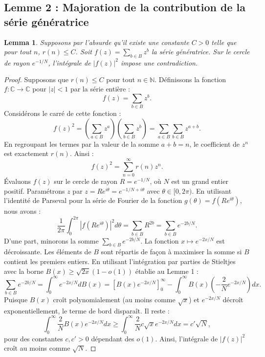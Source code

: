 \documentclass[11pt,a4paper]{article}
\newtheorem{lemma}[theorem]{Lemma}
\begin{document}
\subsection{Lemme 2 : Majoration de la contribution de la s\'erie g\'en\'eratrice}
\begin{lemma}
Supposons par l'absurde qu'il existe une constante $C > 0$ telle que pour tout $n$, $r(n) \le C$. Soit $f(z) = \sum_{b \in B} z^b$ la s\'erie g\'en\'eratrice. Sur le cercle de rayon $e^{-1/N}$, l'int\'egrale de $|f(z)|^2$ impose une contradiction.
\end{lemma}
\begin{proof}
Supposons que $r(n) \le C$ pour tout $n \in \mathbb{N}$.
D\'efinissons la fonction $f : \mathbb{C} \to \mathbb{C}$ pour $|z| < 1$ par la s\'erie enti\`ere :
\begin{equation}
f(z) = \sum_{b \in B} z^b.
\end{equation}
Consid\'erons le carr\'e de cette fonction :
\begin{equation}
f(z)^2 = \left(\sum_{a \in B} z^a\right) \left(\sum_{b \in B} z^b\right) = \sum_{a \in B} \sum_{b \in B} z^{a+b}.
\end{equation}
En regroupant les termes par la valeur de la somme $a + b = n$, le coefficient de $z^n$ est exactement $r(n)$. Ainsi :
\begin{equation}
f(z)^2 = \sum_{n=0}^\infty r(n) z^n.
\end{equation}
\'Evaluons $f(z)$ sur le cercle de rayon $R = e^{-1/N}$, o\`u $N$ est un grand entier positif. Param\'etrons $z$ par $z = R e^{i\theta} = e^{-1/N + i\theta}$ avec $\theta \in [0, 2\pi)$.
En utilisant l'identit\'e de Parseval pour la s\'erie de Fourier de la fonction $g(\theta) = f(R e^{i\theta})$, nous avons :
\begin{equation}
\frac{1}{2\pi} \int_{0}^{2\pi} |f(R e^{i\theta})|^2 d\theta = \sum_{b \in B} R^{2b} = \sum_{b \in B} e^{-2b/N}.
\end{equation}
D'une part, minorons la somme $\sum_{b \in B} e^{-2b/N}$. La fonction $x \mapsto e^{-2x/N}$ est d\'ecroissante.
Les \'el\'ements de $B$ sont r\'epartis de fa\c{c}on \`a maximiser la somme si $B$ contient les premiers entiers.
En utilisant l'int\'egration par parties de Stieltjes avec la borne $B(x) \ge \sqrt{2x}(1 - o(1))$ \'etablie au Lemme 1 :
\begin{equation}
\sum_{b \in B} e^{-2b/N} = \int_{0}^\infty e^{-2x/N} dB(x) = \left[ B(x) e^{-2x/N} \right]_0^\infty - \int_{0}^\infty B(x) \left(-\frac{2}{N} e^{-2x/N}\right) dx.
\end{equation}
Puisque $B(x)$ cro\^it polynomialement (au moins comme $\sqrt{x}$) et $e^{-2x/N}$ d\'ecro\^it exponentiellement, le terme de bord dispara\^it. Il reste :
\begin{equation}
\int_{0}^\infty \frac{2}{N} B(x) e^{-2x/N} dx \ge \int_{0}^\infty \frac{2}{N} c \sqrt{x} e^{-2x/N} dx = c' \sqrt{N},
\end{equation}
pour des constantes $c, c' > 0$ d\'ependant des $o(1)$. Ainsi, l'int\'egrale de $|f(z)|^2$ cro\^it au moins comme $\sqrt{N}$.


\end{proof}
\end{document}
